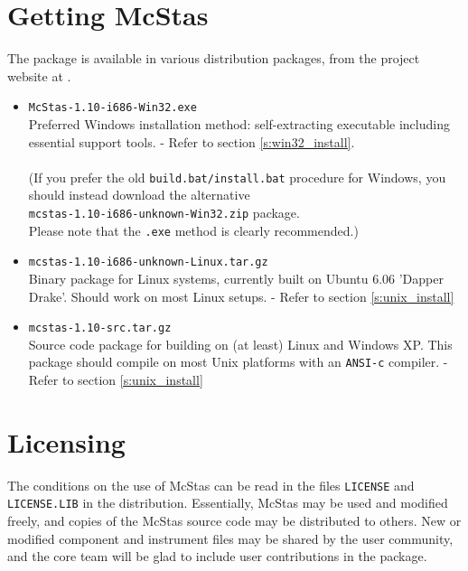 \label{s:install}

\section{Getting McStas}
\label{s:obtain}
The  package is
available in various distribution packages, from the project
website at
.
\begin{itemize}
\item{\texttt{McStas-1.10-i686-Win32.exe}\\Preferred Windows
    installation method: self-extracting executable
    including essential support tools. - Refer to section
    \ref{s:win32_install}. \\\ \\(If you prefer the old \verb+build.bat/install.bat+
    procedure for Windows, you should instead download the alternative 
    \\\texttt{mcstas-1.10-i686-unknown-Win32.zip} package. \\Please note that
    the \verb+.exe+ method is clearly recommended.)}
\item{\texttt{mcstas-1.10-i686-unknown-Linux.tar.gz}\\Binary package
  for Linux systems, currently built on Ubuntu 6.06 'Dapper Drake'.
  Should work on most Linux setups.
 - Refer to section \ref{s:unix_install}}
\item{\texttt{mcstas-1.10-src.tar.gz}\\Source code package for
    building  on
    (at least) Linux and Windows XP. This package should compile on
    most Unix platforms with an \texttt{ANSI-c} compiler. - Refer to section \ref{s:unix_install}}
\end{itemize}

\section{Licensing}
The conditions on the use of McStas can be read in the files
\verb+LICENSE+ and \verb+LICENSE.LIB+ in the distribution. Essentially,
McStas may be used and modified freely, and copies of the McStas source code
may be distributed to others.
New or modified component and instrument files may be shared by
the user community, and the core team will be glad to include user contributions in the package.

